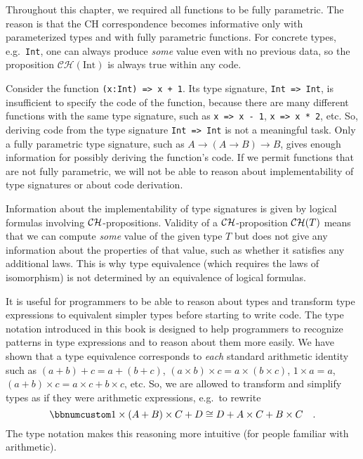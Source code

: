 Throughout this chapter, we required all functions to be fully parametric.
The reason is that the CH correspondence becomes informative only
with parameterized types and with fully parametric functions. For
concrete types, e.g.\ \lstinline!Int!, one can always produce \emph{some}
value even with no previous data, so the proposition $\mathcal{CH}(\text{Int})$
is always true within any code.

Consider the function \lstinline!(x:Int) => x + 1!. Its type signature,
\lstinline!Int => Int!, is insufficient to specify the code of the
function, because there are many different functions with the same
type signature, such as \lstinline!x => x - 1!, \lstinline!x => x * 2!,
etc. So, deriving code from the type signature \lstinline!Int => Int!
is not a meaningful task. Only a fully parametric type signature,
such as $A\rightarrow\left(A\rightarrow B\right)\rightarrow B$, gives
enough information for possibly deriving the function\textsf{'}s code. If we
permit functions that are not fully parametric, we will not be able
to reason about implementability of type signatures or about code
derivation.

Information about the implementability of type signatures is given
by logical formulas involving ${\cal CH}$-propositions. Validity
of a ${\cal CH}$-proposition ${\cal CH}(T)$ means that we can compute
\emph{some} value of the given type $T$ but does not give any information
about the properties of that value, such as whether it satisfies any
additional laws. This is why type equivalence (which requires the
laws of isomorphism) is not determined by an equivalence of logical
formulas.

It is useful for programmers to be able to reason about types and
transform type expressions to equivalent simpler types before starting
to write code. The type notation introduced in this book is designed
to help programmers to recognize patterns in type expressions and
to reason about them more easily. We have shown that a type equivalence
corresponds to \emph{each} standard arithmetic identity such as $\left(a+b\right)+c=a+\left(b+c\right)$,
$\left(a\times b\right)\times c=a\times(b\times c)$, $1\times a=a$,
$\left(a+b\right)\times c=a\times c+b\times c$, etc. So, we are allowed
to transform and simplify types as if they were arithmetic expressions,
e.g.~to rewrite
\[
\bbnum 1\times\left(A+B\right)\times C+D\cong D+A\times C+B\times C\quad.
\]
The type notation makes this reasoning more intuitive (for people
familiar with arithmetic). 

